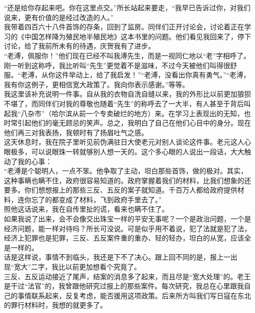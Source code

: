 “还是给你存起来吧。你在这里点交。”所长站起来要走，“我早已告诉过你，对我们说来，更有价值的是经过改造的人。”\\

我带着四百六十八件首饰的存条，回到了监房。同伴们正开讨论会，讨论着正在学习的《中国怎样降为殖民地半殖民地》这本书里的问题。他们看见我回来了，停下讨论，给了我前所未有的待遇，庆贺我有了进步。\\

“老溥，佩服你！”他们现在已经不叫我溥先生，而是一视同仁地以“老”字相呼了。刚一听到这称呼，我比听叫“先生”更觉着不是滋味，不过今天被他们叫得很舒服。“老溥，从你这件举动上，给了我启发！”“老溥，没看出你真有勇气。”“老溥，我有你这例子，更相信宽大政策了。我向你表示感谢。”等等。\\

我这里该补充说明一件事。自从我的衣物自洗自缝以来，我的外形比以前更加狼狈不堪了，而同伴们对我的尊敬也随着“先生”的称呼去了一大半，有人甚至于背后叫起我“八杂市”（哈尔滨从前一个专卖破烂的地方）来。在学习上表现出的无知，也时常引起他们的毫无顾忌的笑声。总之，我明白了自己在他们心目中的身分。现在他们再三对我表扬，我顿时有了扬眉吐气之感。\\

这天休息时，我在院子里听见前伪满驻日大使老元对别人谈论这件事。老元这人心眼极多，可以说眼珠一转就够别人想一天的。这个多心眼的人说出一段话，大大触动了我的心事：\\

“老溥是个聪明人，一点不笨。他争取了主动，坦白那些首饰，做的极对。其实，这种事瞒也瞒不住，政府很容易知道的。政府掌握着我们的材料，比我们想象的还要多。你们想想报上的那些三反、五反的案子就知道。千百万人都给政府提供材料，连你忘了的都变成了材料，飞到政府手里去了。”\\

照他这话说来，我在自传里扯的谎，看来也瞒不住了。\\

如果我说了出来，会不会像交出珠宝一样的平安无事呢？一个是政治问题，一个是经济问题，能一样对待吗？所长可没说。可是似乎用不着说，犯了法就是犯了法，经济上犯罪也是犯罪，三反、五反案件重的重办、轻的轻办，坦白的从宽，应该全是一样的。\\

话是这样说，事情不到临头，我还是下不了决心。跟上回不同的是，报上一出现“宽大”二字，我比以前更加想看个究竟了。\\

三反、五反运动接近了尾声，结案的消息多了起来，而且尽是“宽大处理”的。老王是干过“法官”的，我曾跟他研究过报上的那些案件。每次研究，我总在心里跟我自己的事情联系起来，反复考虑，能否援用这项政策。后来所方叫我们写日寇在东北的罪行材料时，我想的就更多了。\\

